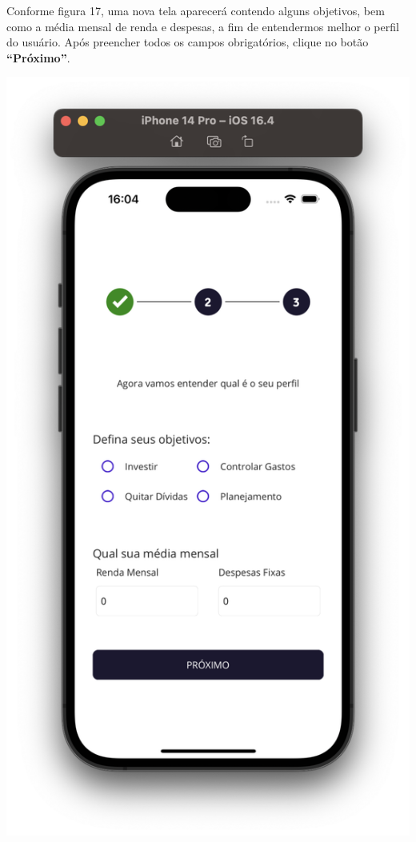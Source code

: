 \begin{center}
\begin{minipage}{0.3\textwidth}
            \label{fig:figura16}
        \end{minipage}%
    \end{center}
    

Conforme figura 17, uma nova tela aparecerá contendo alguns objetivos, bem como a média mensal de renda e despesas, a fim de entendermos melhor o perfil do usuário. Após preencher todos os campos obrigatórios, clique no botão \textbf{“Próximo”}.

    \begin{center}
        \begin{minipage}{0.3\textwidth}
            \centering
            \includegraphics[scale=0.2]{figs/figura17.png}
            \label{fig:figura17}
        \end{minipage}%
    \end{center}

